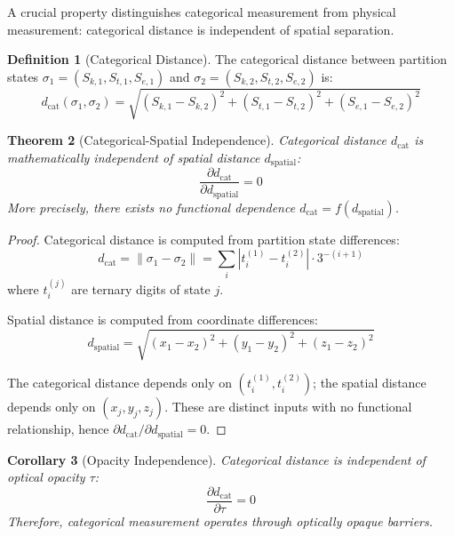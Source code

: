\documentclass[twocolumn,10pt,a4paper]{article}
\newtheorem{theorem}{Theorem}[section]
\newtheorem{corollary}[theorem]{Corollary}
\theoremstyle{definition}
\newtheorem{definition}[theorem]{Definition}
\theoremstyle{remark}
\newcommand{\dcat}{d_{\mathrm{cat}}}
\begin{document}
A crucial property distinguishes categorical measurement from physical measurement: categorical distance is independent of spatial separation.

\begin{definition}[Categorical Distance]
\label{def:cat_distance}
The categorical distance between partition states $\sigma_1 = (S_{k,1}, S_{t,1}, S_{e,1})$ and $\sigma_2 = (S_{k,2}, S_{t,2}, S_{e,2})$ is:
\begin{equation}
    \dcat(\sigma_1, \sigma_2) = \sqrt{(S_{k,1} - S_{k,2})^2 + (S_{t,1} - S_{t,2})^2 + (S_{e,1} - S_{e,2})^2}
\end{equation}
\end{definition}

\begin{theorem}[Categorical-Spatial Independence]
\label{thm:independence}
Categorical distance $\dcat$ is mathematically independent of spatial distance $d_{\text{spatial}}$:
\begin{equation}
    \frac{\partial \dcat}{\partial d_{\text{spatial}}} = 0
\end{equation}
More precisely, there exists no functional dependence $\dcat = f(d_{\text{spatial}})$.
\end{theorem}

\begin{proof}
Categorical distance is computed from partition state differences:
\begin{equation}
    \dcat = \|\sigma_1 - \sigma_2\| = \sum_i |t_i^{(1)} - t_i^{(2)}| \cdot 3^{-(i+1)}
\end{equation}
where $t_i^{(j)}$ are ternary digits of state $j$.

Spatial distance is computed from coordinate differences:
\begin{equation}
    d_{\text{spatial}} = \sqrt{(x_1 - x_2)^2 + (y_1 - y_2)^2 + (z_1 - z_2)^2}
\end{equation}

The categorical distance depends only on $(t_i^{(1)}, t_i^{(2)})$; the spatial distance depends only on $(x_j, y_j, z_j)$. These are distinct inputs with no functional relationship, hence $\partial \dcat / \partial d_{\text{spatial}} = 0$.
\end{proof}

\begin{corollary}[Opacity Independence]
\label{cor:opacity}
Categorical distance is independent of optical opacity $\tau$:
\begin{equation}
    \frac{\partial \dcat}{\partial \tau} = 0
\end{equation}
Therefore, categorical measurement operates through optically opaque barriers.
\end{corollary}
\end{document}
